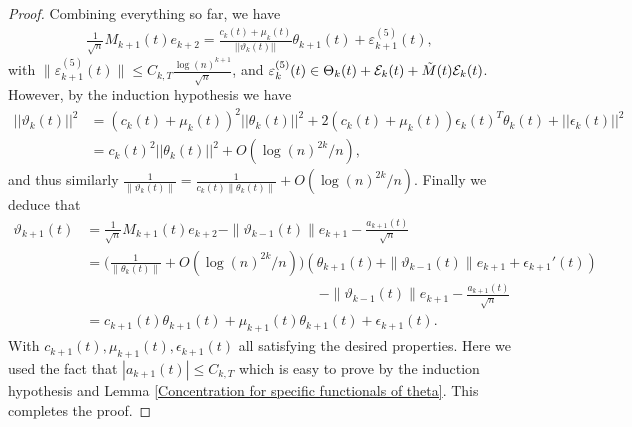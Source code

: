 \documentclass{amsart}
\numberwithin{equation}{section}
\begin{document}
\begin{proof}
Combining everything so far, we have
\begin{equation*}
    \begin{split}
        \frac{1}{\sqrt{n}}M_{k+1}(t)e_{k+2}=\frac{c_k(t)+\mu_k(t)}{||\vartheta_{k}(t)||}\theta_{k+1}(t)+ \varepsilon_{k+1}^{(5)}(t),
    \end{split}
\end{equation*}
with $\|\varepsilon_{k+1}^{(5)}(t)\|\leq C_{k,T}\frac{\log(n)^{k+1}}{\sqrt{n}}$, and $\varepsilon_k^{(5)}(t) \in \Theta_{k}(t)+\mathcal{E}_{k}(t)+\Tilde{M}(t)\mathcal{E}_{k}(t)$. However, by the induction hypothesis we have
\begin{equation}\label{Norm of theta computation}
    \begin{split}
        ||\vartheta_k(t)||^2&=(c_k(t)+\mu_k(t))^2||\theta_k(t)||^2+2(c_k(t)+\mu_k(t))\epsilon_k(t)^T\theta_k(t)+||\epsilon_k(t)||^2\\
        &=c_k(t)^2||\theta_k(t)||^2+O(\log(n)^{2k}/n),
    \end{split}
\end{equation}
and thus similarly $\frac{1}{\|\vartheta_k(t)\|}=\frac{1}{c_k(t)\|\theta_k(t)\|}+O(\log(n)^{2k}/n)$. Finally we deduce that 
\begin{equation*}
    \begin{split}
        \vartheta_{k+1}(t)&=\frac{1}{\sqrt{n}}M_{k+1}(t)e_{k+2}-\|\vartheta_{k-1}(t)\|e_{k+1}-\frac{a_{k+1}(t)}{\sqrt{n}}\\
        &=\bigg(\frac{1}{\|\theta_{k}(t)\|}+O(\log(n)^{2k}/n)\bigg)(\theta_{k+1}(t)+\|\vartheta_{k-1}(t)\|e_{k+1}+ \epsilon_{k+1}'(t))\\
        &\hspace{7cm}-\|\vartheta_{k-1}(t)\|e_{k+1}-\frac{a_{k+1}(t)}{\sqrt{n}}\\
        &=c_{k+1}(t)\theta_{k+1}(t)+\mu_{k+1}(t)\theta_{k+1}(t)+\epsilon_{k+1}(t).
    \end{split}
\end{equation*}
With $c_{k+1}(t),\mu_{k+1}(t),\epsilon_{k+1}(t)$ all satisfying the desired properties. Here we used the fact that $|a_{k+1}(t)| \leq C_{k,T}$ which is easy to prove by the induction hypothesis and Lemma \ref{Concentration for specific functionals of theta}. This completes the proof. 
\end{proof}
\end{document}
